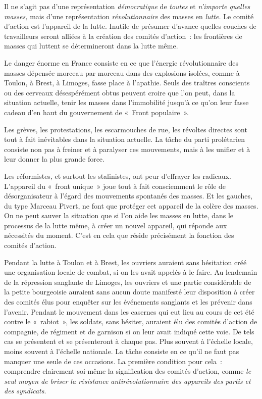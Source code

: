 \documentclass[french,twoside]{book} %
\begin{document}
Il ne s’agit pas d’une représentation \emph{démocratique} de \emph{toutes} et \emph{n’importe quelles masses,} mais d’une représentation \emph{révolutionnaire} des masses en \emph{lutte.} Le comité d’action est l’appareil de la lutte. Inutile de présumer d’avance quelles couches de travailleurs seront alliées à la création des comités d’action : les frontières de masses qui luttent se détermineront dans la lutte même.\par
Le danger énorme en France consiste en ce que l’énergie révolutionnaire des masses dépensée morceau par morceau dans des explosions isolées, comme à Toulon, à Brest, à Limoges, fasse place à l’apathie. Seuls des traîtres conscients ou des cerveaux désespérément obtus peuvent croire que l’on peut, dans la situation actuelle, tenir les masses dans l’immobilité jusqu’à ce qu’on leur fasse cadeau d’en haut du gouvernement de « Front populaire ».\par
Les grèves, les protestations, les escarmouches de rue, les révoltes directes sont tout à fait inévitables dans la situation actuelle. La tâche du parti prolétarien consiste non pas à freiner et à paralyser ces mouvements, mais à les unifier et à leur donner la plus grande force.\par
Les réformistes, et surtout les stalinistes, ont peur d’effrayer les radicaux. L’appareil du « front unique » joue tout à fait consciemment le rôle de désorganisateur à  l’égard des mouvements spontanés des masses. Et les gauches, du type Marceau Pivert, ne font que protéger cet appareil de la colère des masses. On ne peut sauver la situation que si l’on aide les masses en lutte, dans le processus de la lutte même, à créer un nouvel appareil, qui réponde aux nécessités du moment. C’est en cela que réside précisément la fonction des comités d’action.\par
Pendant la lutte à Toulon et à Brest, les ouvriers auraient sans hésitation créé une organisation locale de combat, si on les avait appelés à le faire. Au lendemain de la répression sanglante de Limoges, les ouvriers et une partie considérable de la petite bourgeoisie auraient sans aucun doute manifesté leur disposition à créer des comités élus pour enquêter sur les événements sanglants et les prévenir dans l’avenir. Pendant le mouvement dans les casernes qui eut lieu au cours de cet été contre le « rabiot », les soldats, sans hésiter, auraient élu des comités d’action de compagnie, de régiment et de garnison si on leur avait indiqué cette voie. De tels cas se présentent et se présenteront à chaque pas. Plus souvent à l’échelle locale, moins souvent à l’échelle nationale. La tâche consiste en ce qu’il ne faut pas manquer une seule de ces occasions. La première condition pour cela : comprendre clairement soi-même la signification des comités d’action, comme \emph{le seul moyen de briser la résistance antirévolutionnaire des appareils des partis et des syndicats}.\par
\end{document}
